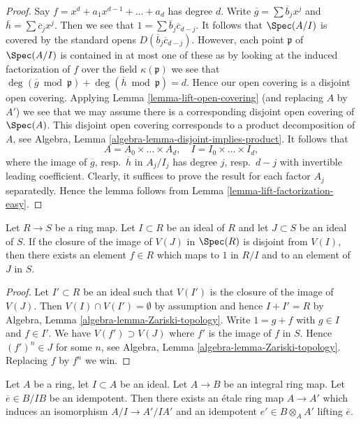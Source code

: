 \begin{proof}
Say $f = x^d + a_1 x^{d - 1} + \ldots + a_d$ has degree $d$.
Write $\overline{g} = \sum \overline{b}_j x^j$ and
$\overline{h} = \sum \overline{c}_j x^j$. Then we see that
$1 = \sum \overline{b}_j \overline{c}_{d - j}$. It follows that
$\Spec(A/I)$ is covered by the standard opens
$D(\overline{b}_j \overline{c}_{d - j})$. However, each point
$\mathfrak p$ of $\Spec(A/I)$ is contained in at most one of these as
by looking at the induced factorization of $f$ over the field
$\kappa(\mathfrak p)$ we see that $\deg(\overline{g} \bmod \mathfrak p) +
\deg(\overline{h} \bmod \mathfrak p) = d$. Hence our open covering
is a disjoint open covering. Applying Lemma \ref{lemma-lift-open-covering}
(and replacing $A$ by $A'$) we see that we may assume there is a
corresponding disjoint open covering of $\Spec(A)$. This disjoint open
covering corresponds to a product decomposition of $A$, see
Algebra, Lemma \ref{algebra-lemma-disjoint-implies-product}. It follows that
$$
A = A_0 \times \ldots \times A_d,
\quad
I = I_0 \times \ldots \times I_d,
$$
where the image of $\overline{g}$, resp.\ $\overline{h}$ in $A_j/I_j$
has degree $j$, resp.\ $d - j$ with invertible leading coefficient.
Clearly, it suffices to prove the result for each factor $A_j$
separatedly. Hence the lemma follows from
Lemma \ref{lemma-lift-factorization-easy}.
\end{proof}

\begin{lemma}
\label{lemma-separate-image-closed-from-closed}
Let $R \to S$ be a ring map. Let $I \subset R$ be an ideal of $R$
and let $J \subset S$ be an ideal of $S$. If the closure of the image
of $V(J)$ in $\Spec(R)$ is disjoint from $V(I)$, then there exists
an element $f \in R$ which maps to $1$ in $R/I$ and to an element
of $J$ in $S$.
\end{lemma}

\begin{proof}
Let $I' \subset R$ be an ideal such that $V(I')$ is the closure of
the image of $V(J)$. Then $V(I) \cap V(I') = \emptyset$ by assumption
and hence $I + I' = R$ by
Algebra, Lemma \ref{algebra-lemma-Zariski-topology}.
Write $1 = g + f$ with $g \in I$ and $f \in I'$.
We have $V(f') \supset V(J)$ where $f'$ is the image of $f$ in $S$.
Hence $(f')^n \in J$ for some $n$, see
Algebra, Lemma \ref{algebra-lemma-Zariski-topology}.
Replacing $f$ by $f^n$ we win.
\end{proof}

\begin{lemma}
\label{lemma-lift-idempotent-upstairs}
Let $A$ be a ring, let $I \subset A$ be an ideal.
Let $A \to B$ be an integral ring map.
Let $\overline{e} \in B/IB$ be an idempotent.
Then there exists an \'etale ring map $A \to A'$
which induces an isomorphism $A/I \to A'/IA'$ and an idempotent
$e' \in B \otimes_A A'$ lifting $\overline{e}$.
\end{lemma}

